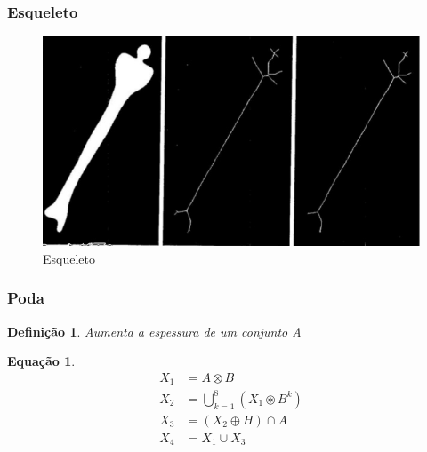 \documentclass[aspectratio=169]{beamer}
\theoremstyle{Definition}
\newtheorem{defn}{Defini\c c\~ao}
\newtheorem{eq}[theorem]{Equa\c c\~ao}
\begin{document}
\begin{frame}
	\frametitle{Esqueleto}
	
	\begin{figure}[h]
	 	\includegraphics[width=0.6\paperwidth,height=0.6\paperheight]{imagens/skeleton1}
		\caption{Esqueleto}\label{figLogical}
	\end{figure}
	
\end{frame}

\begin{frame}
	\frametitle{Poda}
	
	\begin{defn}
		Aumenta a espessura de um conjunto A
	\end{defn}
	
	\begin{eq}
			\begin{align}
				X_1 &= A \otimes B \\
				X_2 &= \bigcup^8_{k=1} (X_1 \circledast B^k) \\
				X_3 &= (X_2 \oplus H) \cap A \\
				X_4 &= X_1 \cup X_3
		\end{align}
	\end{eq}
	
\end{frame}
\end{document}
